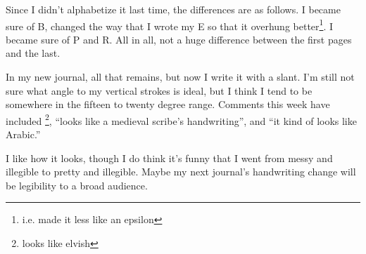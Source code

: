 \documentclass[12pt]{article}[titlepage]
\newcommand{\say}[1]{``#1''}
\newcommand{\1}{\={a}}
\newcommand{\2}{\={e}}
\newcommand{\3}{\={\i}}
\newcommand{\4}{\=o}
\newcommand{\5}{\=u}
\newcommand{\6}{\={A}}
\renewcommand{\,}{\textsuperscript{,}}
\begin{document}
Since I didn't alphabetize it last time, the differences are as follows.
I became sure of B, changed the way that I wrote my E so that it overhung better\footnote{i.e. made it less like an epsilon}.
I became sure of P and R.
All in all, not a huge difference between the first pages and the last.

In my new journal, all that remains, but now I write it with a slant.
I'm still not sure what angle to my vertical strokes is ideal, but I think I tend to be somewhere in the fifteen to twenty degree range.
Comments this week have included \footnote{looks like elvish}, \say{looks like a medieval scribe's handwriting}, and \say{it kind of looks like Arabic.}

I like how it looks, though I do think it's funny that I went from messy and illegible to pretty and illegible.
Maybe my next journal's handwriting change will be legibility to a broad audience.
\end{document}
